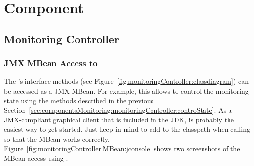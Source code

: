 %


\chapter{\KiekerMonitoringPart{} Component}\label{chap:componentsMonitoring}


\section{Monitoring Controller}\label{sec:componentsMonitoring:monitoringController}



\subsection{JMX MBean Access to }

The 's %
interface methods (see Figure~\ref{fig:monitoringController:classdiagram}) can be accessed %
as a JMX MBean. For example, this allows to control the monitoring state using %
the methods described in the previous Section~\ref{sec:componentsMonitoring:monitoringController:controState}. %
As a JMX-compliant graphical client that is included in the JDK,  %
is probably the easiest way to get started. Just keep in mind to add \Kieker{} to the classpath when calling  so that the MBean works correctly. Figure~\ref{fig:monitoringController:MBean:jconsole} %
shows two screenshots of the MBean access using .

